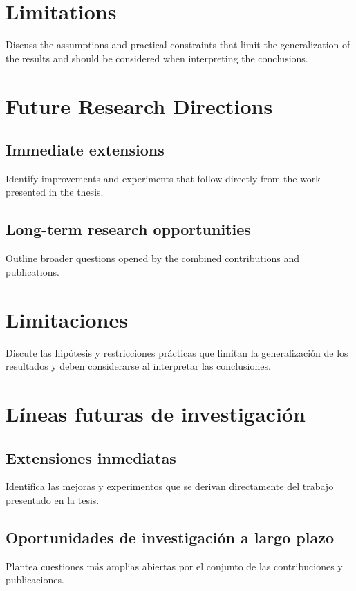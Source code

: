 {
  \section{Limitations}

  Discuss the assumptions and practical constraints that limit the generalization of the results and should be considered when interpreting the conclusions.

  \section{Future Research Directions}
  \subsection{Immediate extensions}

  Identify improvements and experiments that follow directly from the work presented in the thesis.

  \subsection{Long-term research opportunities}

  Outline broader questions opened by the combined contributions and publications.
}
{
  \section{Limitaciones}

  Discute las hipótesis y restricciones prácticas que limitan la generalización de los resultados y deben considerarse al interpretar las conclusiones.

  \section{Líneas futuras de investigación}
  \subsection{Extensiones inmediatas}

  Identifica las mejoras y experimentos que se derivan directamente del trabajo presentado en la tesis.

  \subsection{Oportunidades de investigación a largo plazo}

  Plantea cuestiones más amplias abiertas por el conjunto de las contribuciones y publicaciones.
}








